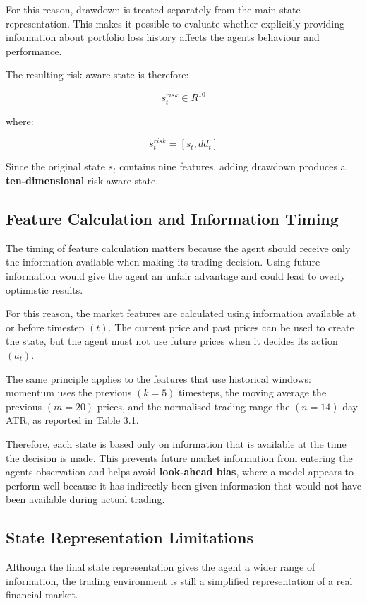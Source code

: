 For this reason, drawdown is treated separately from the main state
representation. This makes it possible to evaluate whether explicitly
providing information about portfolio loss history affects the
agent\textquotesingle s behaviour and performance.

The resulting risk-aware state is therefore:

\[s_{t}^{risk} \in R^{10}\]

where:

\[s_{t}^{risk} = \left\lbrack s_{t},dd_{t} \right\rbrack\]

Since the original state \(s_{t}\) contains nine features, adding
drawdown produces a \textbf{ten-dimensional} risk-aware state.

\subsection{Feature Calculation and Information Timing}

The timing of feature calculation matters because the agent should
receive only the information available when making its trading decision.
Using future information would give the agent an unfair advantage and
could lead to overly optimistic results.

For this reason, the market features are calculated using information
available at or before timestep \((t)\). The current price and past
prices can be used to create the state, but the agent must not use
future prices when it decides its action \((a_{t})\).

The same principle applies to the features that use historical windows:
momentum uses the previous \((k = 5)\) timesteps, the moving average the
previous \((m = 20)\) prices, and the normalised trading range the
\((n = 14)\)-day ATR, as reported in Table 3.1.

Therefore, each state is based only on information that is available at
the time the decision is made. This prevents future market information
from entering the agent\textquotesingle s observation and helps avoid
\textbf{look-ahead bias}, where a model appears to perform well because
it has indirectly been given information that would not have been
available during actual trading.

\subsection{State Representation Limitations}

Although the final state representation gives the agent a wider range of
information, the trading environment is still a simplified
representation of a real financial market.

